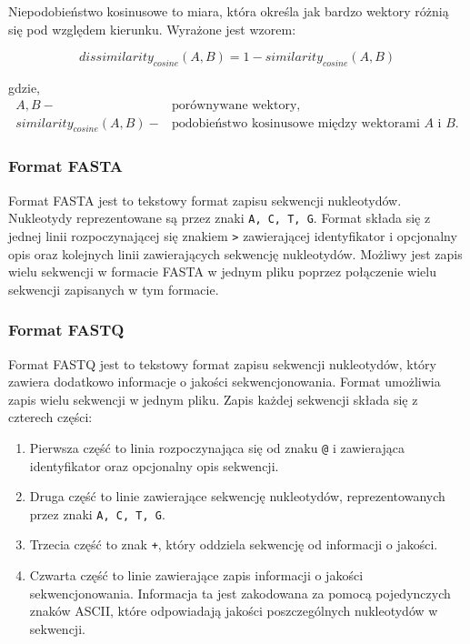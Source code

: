             Niepodobieństwo kosinusowe to miara, która określa jak bardzo wektory różnią się pod względem kierunku. Wyrażone jest wzorem:

            \begin{equation}
                dissimilarity_{cosine}(A, B) = 1 - similarity_{cosine}(A, B)
                \label{Equation:CosineDissimilarity}
            \end{equation}

            gdzie,
            \begin{align*}
                A, B -& \text{porównywane wektory,} \\
                similarity_{cosine}(A, B) -& \text{podobieństwo kosinusowe między wektorami $A$ i $B$.}
            \end{align*}

        \subsubsection{Format FASTA}

            Format FASTA jest to tekstowy format zapisu sekwencji nukleotydów. Nukleotydy reprezentowane są przez znaki \texttt{A, C, T, G}. Format składa się z jednej linii rozpoczynającej się znakiem \texttt{>} zawierającej identyfikator i opcjonalny opis oraz kolejnych linii zawierających sekwencję nukleotydów. Możliwy jest zapis wielu sekwencji w formacie FASTA w jednym pliku poprzez połączenie wielu sekwencji zapisanych w tym formacie.

        \subsubsection{Format FASTQ} 

            Format FASTQ jest to tekstowy format zapisu sekwencji nukleotydów, który zawiera dodatkowo informacje o jakości sekwencjonowania. Format umożliwia zapis wielu sekwencji w jednym pliku. Zapis każdej sekwencji składa się z czterech części: 
            \begin{enumerate}
                \item {
                    Pierwsza część to linia rozpoczynająca się od znaku \texttt{@} i zawierająca identyfikator oraz opcjonalny opis sekwencji.
                }
                \item {
                    Druga część to linie zawierające sekwencję nukleotydów, reprezentowanych przez znaki \texttt{A, C, T, G}.
                }
                \item {
                    Trzecia część to znak \texttt{+}, który oddziela sekwencję od informacji o jakości.
                }
                \item {
                    Czwarta część to linie zawierające zapis informacji o jakości sekwencjonowania. Informacja ta jest zakodowana za pomocą pojedynczych znaków ASCII, które odpowiadają jakości poszczególnych nukleotydów w sekwencji.
                }
            \end{enumerate}

